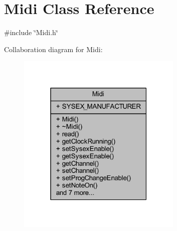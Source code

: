 \hypertarget{class_midi}{}\section{Midi Class Reference}
\label{class_midi}


{\ttfamily \#include \char`\"{}Midi.\+h\char`\"{}}



Collaboration diagram for Midi\+:
\nopagebreak
\begin{figure}[H]
\begin{center}
\leavevmode
\includegraphics[width=223pt]{d6/d12/class_midi__coll__graph}
\end{center}
\end{figure}
